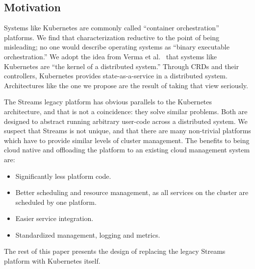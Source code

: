 \subsection{Motivation}
\label{sec:motivation}

Systems like Kubernetes are commonly called ``container orchestration''
platforms. We find that characterization reductive to the point of being
misleading; no one would describe operating systems as ``binary executable
orchestration.'' We adopt the idea from Verma et al.~\cite{borg-2015} that
systems like Kubernetes are ``the kernel of a distributed system.'' Through CRDs
and their controllers, Kubernetes provides state-as-a-service in a distributed
system. Architectures like the one we propose are the result of taking that view 
seriously.

The Streams legacy platform has obvious parallels to the Kubernetes
architecture, and that is not a coincidence: they solve similar problems.
Both are designed to abstract running arbitrary user-code across a distributed
system.  We suspect that Streams is not unique, and that there are many
non-trivial platforms which have to provide similar levels of cluster
management.  The benefits to being cloud native and offloading the platform
to an existing cloud management system are: 
\begin{itemize}
    \item Significantly less platform code.
    \item Better scheduling and resource management, as all services on the cluster are 
        scheduled by one platform.
    \item Easier service integration.
    \item Standardized management, logging and metrics.
\end{itemize}
The rest of this paper presents the design of replacing the legacy Streams 
platform with Kubernetes itself.

